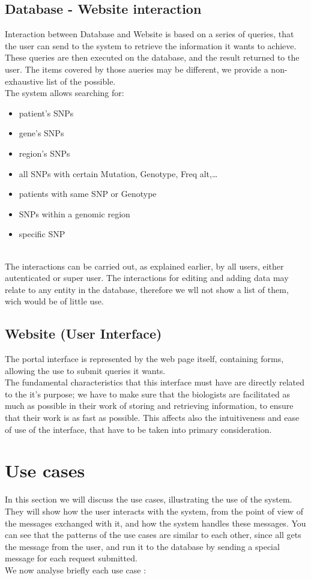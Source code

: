 \subsection{Database - Website interaction}
Interaction between Database and Website is based on a series of queries, that the user can send to the system to retrieve the information it wants to achieve. These queries are then executed on the database, and the result returned to the user. The items covered by those aueries may be different, we provide a non-exhaustive list of the possible. \\The system allows searching for:
\begin{itemize}
 \item patient’s SNPs
 \item gene’s SNPs
 \item region’s SNPs
 \item all SNPs with certain Mutation, Genotype, Freq alt,\ldots
 \item patients with same SNP or Genotype
 \item SNPs within a genomic region
 \item specific SNP
\end{itemize}
\\The interactions can be carried out, as explained earlier, by all users, either autenticated or super user. The interactions for editing and adding data may relate to any entity in the database, therefore we wll not show a list of them, wich would be of little use.

\subsection{Website (User Interface)}
The portal interface is represented by the web page itself, containing forms, allowing the use to submit queries it wants. \\ The fundamental characteristics that this interface must have are directly related to the it's purpose; we have to make sure that the biologists are facilitated as much as possible in their work of storing and retrieving information, to ensure that their work is as fast as possible. This affects also the intuitiveness and ease of use of the interface, that have to be taken into primary consideration.

\section{Use cases}
In this section we will discuss the use cases, illustrating the use of the system. \\They will show how the user interacts with the system, from the point of view of the messages exchanged with it, and how the system handles these messages. You can see that the patterns of the use cases are similar to each other, since all gets the message from the user, and run it to the database by sending a special message for each request submitted. \\We now analyse briefly each use case :
